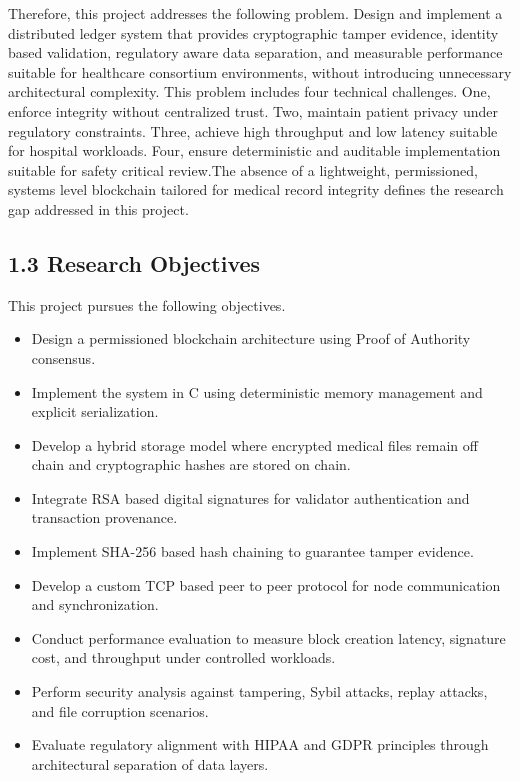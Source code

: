 Therefore, this project addresses the following problem.
Design and implement a distributed ledger system that provides cryptographic tamper evidence, identity based validation, regulatory aware data separation, and measurable performance suitable for healthcare consortium environments, without introducing unnecessary architectural complexity.
This problem includes four technical challenges.
One, enforce integrity without centralized trust.
Two, maintain patient privacy under regulatory constraints.
Three, achieve high throughput and low latency suitable for hospital workloads.
Four, ensure deterministic and auditable implementation suitable for safety critical review.The absence of a lightweight, permissioned, systems level blockchain tailored for medical record integrity defines the research gap addressed in this project.

\subsection*{1.3 Research Objectives}
This project pursues the following objectives.
\begin{itemize}
\item Design a permissioned blockchain architecture using Proof of Authority consensus.
\item Implement the system in C using deterministic memory management and explicit serialization.
\item Develop a hybrid storage model where encrypted medical files remain off chain and cryptographic hashes are stored on chain.
\item Integrate RSA based digital signatures for validator authentication and transaction provenance.
\item Implement SHA-256 based hash chaining to guarantee tamper evidence.
\item Develop a custom TCP based peer to peer protocol for node communication and synchronization.
\item Conduct performance evaluation to measure block creation latency, signature cost, and throughput under controlled workloads.
\item Perform security analysis against tampering, Sybil attacks, replay attacks, and file corruption scenarios.
\item Evaluate regulatory alignment with HIPAA and GDPR principles through architectural separation of data layers.
\end{itemize}

\newpage

